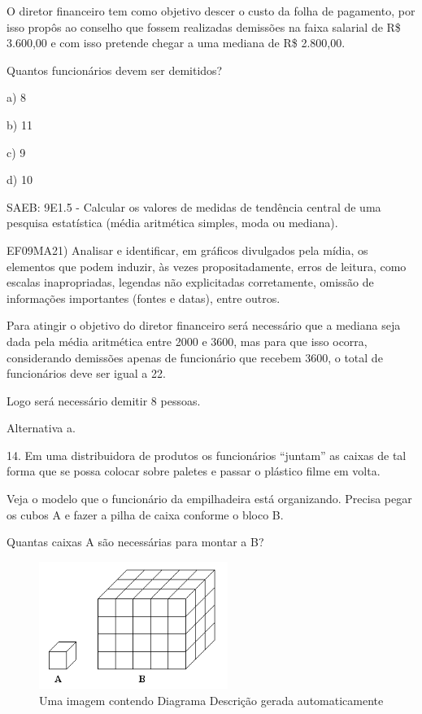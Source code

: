 \begin{escolha}
{{{\begin{escolha}
{{{{{\begin{escolha}
\begin{escolha}
{\begin{q°}
O diretor financeiro tem como objetivo descer o custo da folha de
pagamento, por isso propôs ao conselho que fossem realizadas demissões
na faixa salarial de R\$ 3.600,00 e com isso pretende chegar a uma
mediana de R\$ 2.800,00.

Quantos funcionários devem ser demitidos?

a) 8

b) 11

c) 9

d) 10

SAEB: 9E1.5 - Calcular os valores de medidas de tendência central de uma
pesquisa estatística (média aritmética simples, moda ou mediana).

EF09MA21) Analisar e identificar, em gráficos divulgados pela mídia, os
elementos que podem induzir, às vezes propositadamente, erros de
leitura, como escalas inapropriadas, legendas não explicitadas
corretamente, omissão de informações importantes (fontes e datas), entre
outros.

Para atingir o objetivo do diretor financeiro será necessário que a
mediana seja dada pela média aritmética entre 2000 e 3600, mas para que
isso ocorra, considerando demissões apenas de funcionário que recebem
3600, o total de funcionários deve ser igual a 22.

Logo será necessário demitir 8 pessoas.

Alternativa a.

14. Em uma distribuidora de produtos os funcionários ``juntam'' as
caixas de tal forma que se possa colocar sobre paletes e passar o
plástico filme em volta.

Veja o modelo que o funcionário da empilhadeira está organizando.
Precisa pegar os cubos A e fazer a pilha de caixa conforme o bloco B.

Quantas caixas A são necessárias para montar a B?

\begin{figure}
\centering
\includegraphics[width=2.41146in,height=1.62619in]{./_SAEB_9_MAT/media/image259.png}
\caption{Uma imagem contendo Diagrama Descrição gerada automaticamente}
\end{figure}


\end{q°}}
\end{escolha}
\end{escolha}}}}}}
\end{escolha}}}}
\end{escolha}
